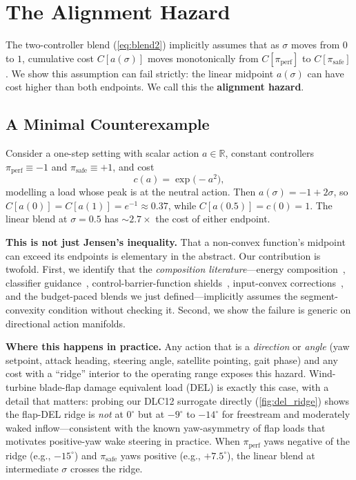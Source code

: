 \documentclass{article}
\begin{document}
\section{The Alignment Hazard}
\label{sec:hazard}

The two-controller blend (\ref{eq:blend2}) implicitly assumes that as $\sigma$ moves from $0$ to $1$, cumulative cost $C[a(\sigma)]$ moves monotonically from $C[\pi_{\mathrm{perf}}]$ to $C[\pi_{\mathrm{safe}}]$.
We show this assumption can fail strictly: the linear midpoint $a(\sigma)$ can have cost higher than both endpoints.
We call this the \textbf{alignment hazard}.

\subsection{A Minimal Counterexample}
\label{sec:counterexample}

Consider a one-step setting with scalar action $a \in \mathbb{R}$, constant controllers $\pi_{\mathrm{perf}} \equiv -1$ and $\pi_{\mathrm{safe}} \equiv +1$, and cost
\begin{equation}
    c(a) = \exp\!\big(-a^2\big),
\label{eq:counterexample_cost}
\end{equation}
modelling a load whose peak is at the neutral action.
Then $a(\sigma) = -1 + 2\sigma$, so $C[a(0)] = C[a(1)] = e^{-1} \approx 0.37$, while $C[a(0.5)] = c(0) = 1$.
The linear blend at $\sigma=0.5$ has $\sim2.7\times$ the cost of either endpoint.

\textbf{This is not just Jensen's inequality.}
That a non-convex function's midpoint can exceed its endpoints is elementary in the abstract.
Our contribution is twofold.
First, we identify that the \emph{composition literature}---energy composition~\citep{urain2023composable}, classifier guidance~\citep{zhang2025constrained}, control-barrier-function shields~\citep{xiao2023safediffuser}, input-convex corrections~\citep{durkin2025picnn}, and the budget-paced blends we just defined---implicitly assumes the segment-convexity condition without checking it.
Second, we show the failure is generic on directional action manifolds.

\textbf{Where this happens in practice.}
Any action that is a \emph{direction} or \emph{angle} (yaw setpoint, attack heading, steering angle, satellite pointing, gait phase) and any cost with a ``ridge'' interior to the operating range exposes this hazard.
Wind-turbine blade-flap damage equivalent load (DEL) is exactly this case, with a detail that matters: probing our DLC12 surrogate directly (\cref{fig:del_ridge}) shows the flap-DEL ridge is \emph{not} at $0^\circ$ but at $-9^\circ$ to $-14^\circ$ for freestream and moderately waked inflow---consistent with the known yaw-asymmetry of flap loads that motivates positive-yaw wake steering in practice.
When $\pi_{\mathrm{perf}}$ yaws negative of the ridge (e.g., $-15^\circ$) and $\pi_{\mathrm{safe}}$ yaws positive (e.g., $+7.5^\circ$), the linear blend at intermediate $\sigma$ crosses the ridge.
\end{document}
